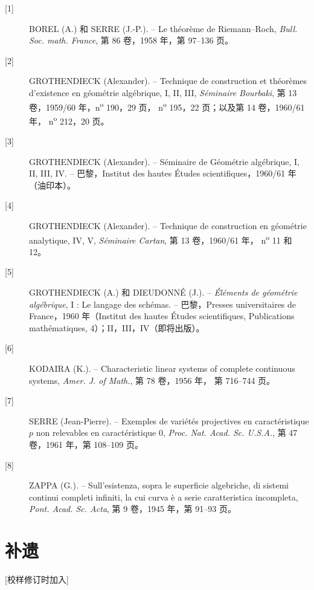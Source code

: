 \documentclass[12pt,twoside,openany]{book}
\numberwithin{equation}{section}
\theoremstyle{plain}
\theoremstyle{definition}
\theoremstyle{remark}
\begin{document}
\begin{description}
\item[{[1]}] BOREL (A.) 和 SERRE (J.-P.). -- Le théorème de Riemann--Roch,
\emph{Bull. Soc. math. France}, 第 86 卷，1958 年，第 97--136 页。

\item[{[2]}] GROTHENDIECK (Alexander). -- Technique de construction et
théorèmes d'existence en géométrie algébrique, I, II, III, \emph{Séminaire
Bourbaki}, 第 13 卷，1959/60 年，n\textsuperscript{o} 190，29 页，
n\textsuperscript{o} 195，22 页；以及第 14 卷，1960/61 年，
n\textsuperscript{o} 212，20 页。

\item[{[3]}] GROTHENDIECK (Alexander). -- Séminaire de Géométrie algébrique,
I, II, III, IV. -- 巴黎，Institut des hautes Études scientifiques，1960/61
年（油印本）。

\item[{[4]}] GROTHENDIECK (Alexander). -- Technique de construction en
géométrie analytique, IV, V, \emph{Séminaire Cartan}, 第 13 卷，1960/61 年，
n\textsuperscript{o} 11 和 12。

\item[{[5]}] GROTHENDIECK (A.) 和 DIEUDONNÉ (J.). -- \emph{Éléments de
géométrie algébrique}, I : Le langage des schémas. -- 巴黎，Presses
universitaires de France，1960 年（Institut des hautes Études scientifiques,
Publications mathématiques, 4）；II，III，IV（即将出版）。

\item[{[6]}] KODAIRA (K.). -- Characteristic linear systems of complete
continuous systems, \emph{Amer. J. of Math.}, 第 78 卷，1956 年，
第 716--744 页。

\item[{[7]}] SERRE (Jean-Pierre). -- Exemples de variétés projectives en
caractéristique $p$ non relevables en caractéristique 0, \emph{Proc. Nat. Acad.
Sc. U.S.A.}, 第 47 卷，1961 年，第 108--109 页。

\item[{[8]}] ZAPPA (G.). -- Sull'esistenza, sopra le superficie algebriche, di
sistemi continui completi infiniti, la cui curva è a serie caratteristica
incompleta, \emph{Pont. Acad. Sc. Acta}, 第 9 卷，1945 年，第 91--93 页。
\end{description}

\section*{补遗}
\begin{center}
{\small [校样修订时加入]}
\end{center}
\end{document}
